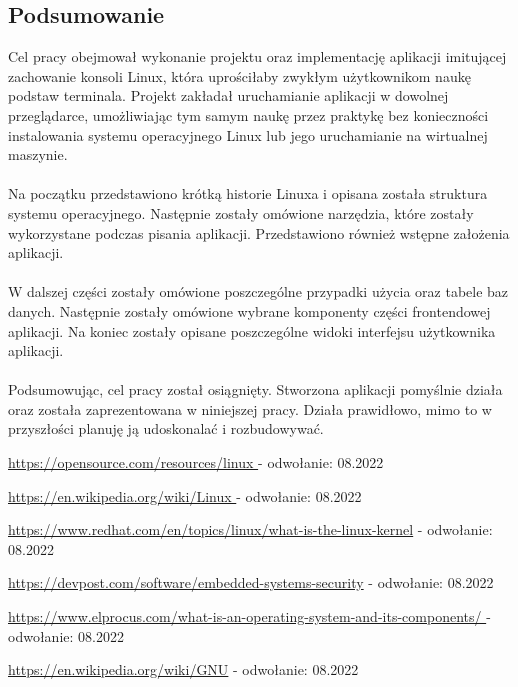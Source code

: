 \documentclass[10pt,a4paper]{report}
\begin{document}
\begin{adjustwidth}{2cm}{2cm}
\chapter*{Podsumowanie}
\begin{minipage}{1\linewidth}
Cel pracy obejmował wykonanie projektu oraz implementację aplikacji imitującej zachowanie konsoli Linux, która uprościłaby zwykłym użytkownikom naukę podstaw terminala. Projekt zakładał uruchamianie aplikacji w dowolnej przeglądarce, umożliwiając tym samym naukę przez praktykę bez konieczności instalowania systemu operacyjnego Linux lub jego uruchamianie na wirtualnej maszynie. \\ \\
Na początku przedstawiono krótką historie Linuxa i opisana została struktura systemu operacyjnego. Następnie zostały omówione narzędzia, które zostały wykorzystane podczas pisania aplikacji. Przedstawiono również wstępne założenia aplikacji. \\ \\
W dalszej części zostały omówione poszczególne przypadki użycia oraz tabele baz danych. Następnie zostały omówione wybrane komponenty części frontendowej aplikacji. Na koniec zostały opisane poszczególne widoki interfejsu użytkownika aplikacji. \\ \\
Podsumowując, cel pracy został osiągnięty. Stworzona aplikacji pomyślnie działa oraz została zaprezentowana w niniejszej pracy. Działa prawidłowo, mimo to w przyszłości planuję ją udoskonalać i rozbudowywać. 
\end{minipage}

\begin{thebibliography}{9}
\setlength\itemsep{0.3cm}
\url{https://opensource.com/resources/linux } - odwołanie: 08.2022

\url{https://en.wikipedia.org/wiki/Linux } - odwołanie: 08.2022

\url{https://www.redhat.com/en/topics/linux/what-is-the-linux-kernel} - odwołanie: 08.2022

\url{https://devpost.com/software/embedded-systems-security} - odwołanie: 08.2022

\url{https://www.elprocus.com/what-is-an-operating-system-and-its-components/ } - odwołanie: 08.2022

\url{https://en.wikipedia.org/wiki/GNU} - odwołanie: 08.2022


\end{thebibliography}
\end{adjustwidth}
\end{document}
